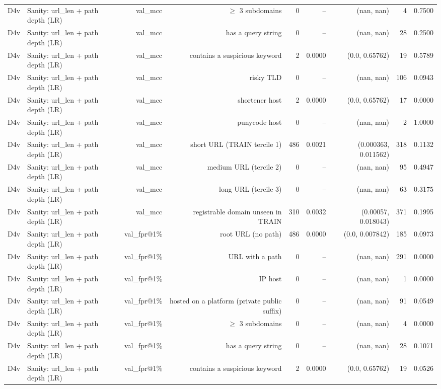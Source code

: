 \begin{table}[t]
\begin{tabular}{llrrrrrrr}
D4v & Sanity: url\_len + path depth (LR) & val\_mcc & $\geq$ 3 subdomains & 0 & -- & (nan, nan) & 4 & 0.7500 \\
D4v & Sanity: url\_len + path depth (LR) & val\_mcc & has a query string & 0 & -- & (nan, nan) & 28 & 0.2500 \\
D4v & Sanity: url\_len + path depth (LR) & val\_mcc & contains a suspicious keyword & 2 & 0.0000 & (0.0, 0.65762) & 19 & 0.5789 \\
D4v & Sanity: url\_len + path depth (LR) & val\_mcc & risky TLD & 0 & -- & (nan, nan) & 106 & 0.0943 \\
D4v & Sanity: url\_len + path depth (LR) & val\_mcc & shortener host & 2 & 0.0000 & (0.0, 0.65762) & 17 & 0.0000 \\
D4v & Sanity: url\_len + path depth (LR) & val\_mcc & punycode host & 0 & -- & (nan, nan) & 2 & 1.0000 \\
D4v & Sanity: url\_len + path depth (LR) & val\_mcc & short URL (TRAIN tercile 1) & 486 & 0.0021 & (0.000363, 0.011562) & 318 & 0.1132 \\
D4v & Sanity: url\_len + path depth (LR) & val\_mcc & medium URL (tercile 2) & 0 & -- & (nan, nan) & 95 & 0.4947 \\
D4v & Sanity: url\_len + path depth (LR) & val\_mcc & long URL (tercile 3) & 0 & -- & (nan, nan) & 63 & 0.3175 \\
D4v & Sanity: url\_len + path depth (LR) & val\_mcc & registrable domain unseen in TRAIN & 310 & 0.0032 & (0.00057, 0.018043) & 371 & 0.1995 \\
D4v & Sanity: url\_len + path depth (LR) & val\_fpr@1\% & root URL (no path) & 486 & 0.0000 & (0.0, 0.007842) & 185 & 0.0973 \\
D4v & Sanity: url\_len + path depth (LR) & val\_fpr@1\% & URL with a path & 0 & -- & (nan, nan) & 291 & 0.0000 \\
D4v & Sanity: url\_len + path depth (LR) & val\_fpr@1\% & IP host & 0 & -- & (nan, nan) & 1 & 0.0000 \\
D4v & Sanity: url\_len + path depth (LR) & val\_fpr@1\% & hosted on a platform (private public suffix) & 0 & -- & (nan, nan) & 91 & 0.0549 \\
D4v & Sanity: url\_len + path depth (LR) & val\_fpr@1\% & $\geq$ 3 subdomains & 0 & -- & (nan, nan) & 4 & 0.0000 \\
D4v & Sanity: url\_len + path depth (LR) & val\_fpr@1\% & has a query string & 0 & -- & (nan, nan) & 28 & 0.1071 \\
D4v & Sanity: url\_len + path depth (LR) & val\_fpr@1\% & contains a suspicious keyword & 2 & 0.0000 & (0.0, 0.65762) & 19 & 0.0526 \\

\end{tabular}
\end{table}
